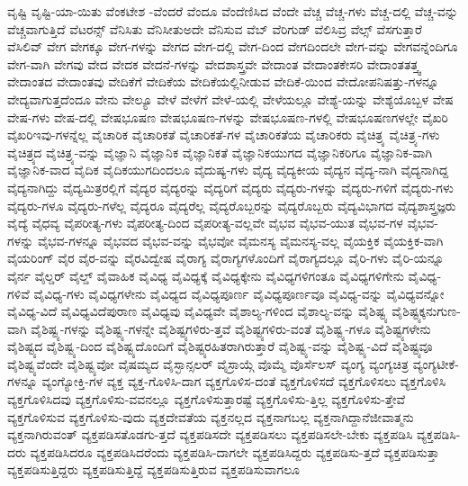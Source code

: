 {ವೃಷ್ಟಿ
ವೃಷ್ಟಿ-ಯಾ-ಯಿತು
ವೆಂಕಟೇಶ
-ವೆಂದರೆ
ವೆಂದೂ
ವೆಂದೆಣಿಸಿದ
ವೆಂದೇ
ವೆಚ್ಚ
ವೆಚ್ಚ-ಗಳು
ವೆಚ್ಚ-ದಲ್ಲಿ
ವೆಚ್ಚ-ವನ್ನು
ವೆಚ್ಚವಾಗುತ್ತಿದೆ
ವೆಟರನ್ಸ್
ವೆನಿಸಿತು
ವೆನಿಸೀತುಅದೇ
ವೆನಿಸುವ
ವೆಬ್
ವೆರಿಗುಡ್
ವೆಲಿಸಿವ್ರ
ವೆಲ್ಸ್
ವೆಸಗುತ್ತಾರೆ
ವೆಸಿಲಿವ್
ವೇಗ
ವೇಗಕ್ಕೂ
ವೇಗ-ಗಳನ್ನು
ವೇಗದ
ವೇಗ-ದಲ್ಲಿ
ವೇಗ-ದಿಂದ
ವೇಗದಿಂದಲೇ
ವೇಗ-ವನ್ನು
ವೇಗವನ್ನೆಂದಿಗೂ
ವೇಗ-ವಾಗಿ
ವೇಗವು
ವೇದ
ವೇದಕ
ವೇದನೆ-ಗಳನ್ನು
ವೇದಶಾಸ್ತ್ರವೇ
ವೇದಾಂತ
ವೇದಾಂತಕೇಸರಿ
ವೇದಾಂತತತ್ತ್ವ
ವೇದಾಂತದ
ವೇದಾಂತವು
ವೇದಿಕೆಗೆ
ವೇದಿಕೆಯ
ವೇದಿಕೆಯಲ್ಲಿನೀಡುವ
ವೇದಿಕೆ-ಯಿಂದ
ವೇದೋಪನಿಷತ್ತು-ಗಳನ್ನೂ
ವೇದ್ಯವಾಗುತ್ತದೆಂದೂ
ವೇನು
ವೇಲ್ಯೂ
ವೇಳೆ
ವೇಳೆಗೆ
ವೇಳೆ-ಯಲ್ಲಿ
ವೇಳೆಯಲ್ಲೂ
ವೇಶ್ಯೆ-ಯನ್ನು
ವೇಶ್ಯೆಯೊಬ್ಬಳ
ವೇಷ
ವೇಷ-ಗಳು
ವೇಷ-ದಲ್ಲಿ
ವೇಷಭೂಷಣ
ವೇಷಭೂಷಣ-ಗಳನ್ನು
ವೇಷಭೂಷಣ-ಗಳಲ್ಲಿ
ವೇಷಭೂಷಣಗಳಲ್ಲೇ
ವೈಖರಿ
ವೈಖರಿಇವು-ಗಳನ್ನೆಲ್ಲ
ವೈಚಾರಿಕ
ವೈಚಾರಿಕತೆ
ವೈಚಾರಿಕತೆ-ಗಳ
ವೈಚಾರಿಕತೆಯ
ವೈಚಾರಿಕರು
ವೈಚಿತ್ರ್ಯ
ವೈಚಿತ್ರ್ಯ-ಗಳು
ವೈಚಿತ್ರ್ಯದ
ವೈಚಿತ್ರ್ಯ-ವನ್ನು
ವೈಜ್ಞಾನಿ
ವೈಜ್ಞಾನಿಕ
ವೈಜ್ಞಾನಿಕತೆ
ವೈಜ್ಞಾನಿಕಯುಗದ
ವೈಜ್ಞಾನಿಕರಿಗೂ
ವೈಜ್ಞಾನಿಕ-ವಾಗಿ
ವೈಜ್ಞಾನಿಕ-ವಾದ
ವೈದಿಕ
ವೈದಿಕಯುಗದಿಂದಲೂ
ವೈದುಷ್ಯ-ಗಳು
ವೈದ್ಯ
ವೈದ್ಯಕೀಯ
ವೈದ್ಯನ
ವೈದ್ಯ-ನಾಗಿ
ವೈದ್ಯನಾಗಿದ್ದ
ವೈದ್ಯನಾಗಿದ್ದು
ವೈದ್ಯಮಿತ್ರರಲ್ಲಿಗೆ
ವೈದ್ಯರ
ವೈದ್ಯರನ್ನು
ವೈದ್ಯರಿಗೆ
ವೈದ್ಯರು
ವೈದ್ಯರು-ಗಳನ್ನು
ವೈದ್ಯರು-ಗಳಿಗೆ
ವೈದ್ಯರು-ಗಳು
ವೈದ್ಯರು-ಗಳೂ
ವೈದ್ಯರು-ಗಳೆಲ್ಲ
ವೈದ್ಯರೂ
ವೈದ್ಯರೆಲ್ಲ
ವೈದ್ಯರೊಬ್ಬರನ್ನು
ವೈದ್ಯರೊಬ್ಬರು
ವೈದ್ಯವಿಭಾಗದ
ವೈದ್ಯಶಾಸ್ತ್ರಜ್ಞರು
ವೈದ್ಯೆ
ವೈಧವ್ಯ
ವೈಪರೀತ್ಯ-ಗಳು
ವೈಪರೀತ್ಯ-ದಿಂದ
ವೈಪರೀತ್ಯ-ವಲ್ಲವೇ
ವೈಭವ
ವೈಭವ-ಯುತ
ವೈಭವ-ಗಳ
ವೈಭವ-ಗಳನ್ನು
ವೈಭವ-ಗಳನ್ನೂ
ವೈಭವದ
ವೈಭವ-ವನ್ನು
ವೈಭವೋ
ವೈಮನಸ್ಯ
ವೈಮನಸ್ಯ-ವಲ್ಲ
ವೈಯಕ್ತಿಕ
ವೈಯಕ್ತಿಕ-ವಾಗಿ
ವೈಯರಿಂಗ್
ವೈರ
ವೈರ-ವನ್ನು
ವೈರವಿದ್ವೇಷ
ವೈರಾಗ್ಯ
ವೈರಾಗ್ಯಗಳೊಂದಿಗೆ
ವೈರಾಗ್ಯದಲ್ಲೂ
ವೈರಿ-ಗಳು
ವೈರಿ-ಯನ್ನೂ
ವೈರ್ನ
ವೈಲ್ಡರ್
ವೈಲ್ಡ್
ವೈವಾಹಿಕ
ವೈವಿಧ್ಯ
ವೈವಿಧ್ಯಕ್ಕೆ
ವೈವಿಧ್ಯಕ್ಕೇನು
ವೈವಿಧ್ಯಗಳಿಗಂತೂ
ವೈವಿಧ್ಯಗಳಿಗೇನು
ವೈವಿಧ್ಯ-ಗಳಿವೆ
ವೈವಿಧ್ಯ-ಗಳು
ವೈವಿಧ್ಯಗಳೇನು
ವೈವಿಧ್ಯದ
ವೈವಿಧ್ಯಪೂರ್ಣ
ವೈವಿಧ್ಯಪೂರ್ಣವೂ
ವೈವಿಧ್ಯ-ವನ್ನು
ವೈವಿಧ್ಯವನ್ನೋ
ವೈವಿಧ್ಯ-ವಿದೆ
ವೈವಿಧ್ಯವಿದೆಪುರಾಣ
ವೈವಿಧ್ಯವು
ವೈವಿಧ್ಯವೇ
ವೈಶಾಲ್ಯ-ಗಳಿಂದ
ವೈಶಾಲ್ಯ-ವನ್ನು
ವೈಶಿಷ್ಟ್ಯ
ವೈಶಿಷ್ಟ್ಯಕ್ಕನುಗುಣ-ವಾಗಿ
ವೈಶಿಷ್ಟ್ಯ-ಗಳನ್ನು
ವೈಶಿಷ್ಟ್ಯ-ಗಳನ್ನೇ
ವೈಶಿಷ್ಟ್ಯಗಳಿರು-ತ್ತವೆ
ವೈಶಿಷ್ಟ್ಯಗಳಿರು-ವಂತೆ
ವೈಶಿಷ್ಟ್ಯ-ಗಳೂ
ವೈಶಿಷ್ಟ್ಯಗಳೇನು
ವೈಶಿಷ್ಟ್ಯದ
ವೈಶಿಷ್ಟ್ಯ-ದಿಂದ
ವೈಶಿಷ್ಟ್ಯದೊಂದಿಗೆ
ವೈಶಿಷ್ಟ್ಯರಹಿತರಾಗಿರುತ್ತಾರೆ
ವೈಶಿಷ್ಟ್ಯ-ವನ್ನು
ವೈಶಿಷ್ಟ್ಯ-ವಿದೆ
ವೈಶಿಷ್ಟ್ಯವೂ
ವೈಶಿಷ್ಟ್ಯವೆಂದೇ
ವೈಶಿಷ್ಟ್ಯವೋ
ವೈಷಮ್ಯದ
ವೈಸ್ಛಾನ್ಸಲರ್
ವೈಸ್ರಾಯ್ಗೆ
ವೊಮ್ಮೆ
ವೊರ್ಸೆಲಸ್
ವ್ಯಂಗ್ಯ
ವ್ಯಂಗ್ಯಚಿತ್ರ
ವ್ಯಂಗ್ಯಟೀಕೆ-ಗಳನ್ನೂ
ವ್ಯಂಗ್ಯೋಕ್ತಿ-ಗಳ
ವ್ಯಕ್ತ
ವ್ಯಕ್ತ-ಗೊಳಿಸಿ-ದಾಗ
ವ್ಯಕ್ತಗೊಳಿಸ-ದಂತೆ
ವ್ಯಕ್ತಗೊಳಿಸದೆ
ವ್ಯಕ್ತಗೊಳಿಸಲು
ವ್ಯಕ್ತಗೊಳಿಸಿ
ವ್ಯಕ್ತಗೊಳಿಸಿದವು
ವ್ಯಕ್ತಗೊಳಿಸು-ವವನಲ್ಲೂ
ವ್ಯಕ್ತಗೊಳಿಸುತ್ತಾರಷ್ಟೆ
ವ್ಯಕ್ತಗೊಳಿಸು-ತ್ತಿಲ್ಲ
ವ್ಯಕ್ತಗೊಳಿಸು-ತ್ತೇವೆ
ವ್ಯಕ್ತಗೊಳಿಸುವ
ವ್ಯಕ್ತಗೊಳಿಸು-ವುದು
ವ್ಯಕ್ತದೇವತೆಯ
ವ್ಯಕ್ತನಲ್ಲದ
ವ್ಯಕ್ತನಾಗಬಲ್ಲ
ವ್ಯಕ್ತನಾಗಿದ್ದಾನೆಜೀವಾತ್ಮನು
ವ್ಯಕ್ತನಾಗಿರುವಂತ್
ವ್ಯಕ್ತಪಡಿಸತೊಡಗು-ತ್ತದೆ
ವ್ಯಕ್ತಪಡಿಸದೇ
ವ್ಯಕ್ತಪಡಿಸಲು
ವ್ಯಕ್ತಪಡಿಸಲೇ-ಬೇಕು
ವ್ಯಕ್ತಪಡಿಸಿ
ವ್ಯಕ್ತಪಡಿಸಿ-ದರು
ವ್ಯಕ್ತಪಡಿಸಿದರೂ
ವ್ಯಕ್ತಪಡಿಸಿದರೆಂದು
ವ್ಯಕ್ತಪಡಿಸಿ-ದಾಗಲೇ
ವ್ಯಕ್ತಪಡಿಸಿದ್ದರು
ವ್ಯಕ್ತಪಡಿಸು-ತ್ತದೆ
ವ್ಯಕ್ತಪಡಿಸುತ್ತಾ
ವ್ಯಕ್ತಪಡಿಸುತ್ತಿದ್ದರು
ವ್ಯಕ್ತಪಡಿಸುತ್ತಿದ್ದೆ
ವ್ಯಕ್ತಪಡಿಸುತ್ತಿರುವ
ವ್ಯಕ್ತಪಡಿಸುವಾಗಲೂ
}

